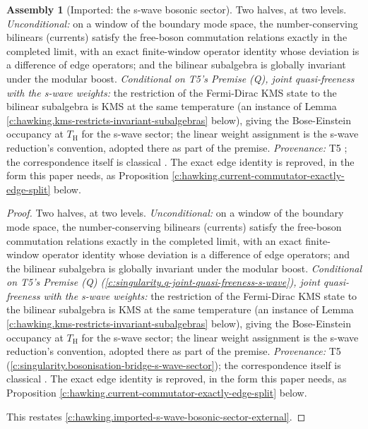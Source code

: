 \documentclass[11pt]{article}
\theoremstyle{definition}
\newtheorem{assembled}[theorem]{Assembly}
\theoremstyle{plain}
\newcommand{\changedmark}[2]{\marginpar{\raggedright\scriptsize\color{#1}#2}}
\providecommand{\TH}{}\renewcommand{\TH}{T_{\mathrm{H}}}
\begin{document}
\begin{assembled}[Imported: the s-wave bosonic sector]\label{c:hawking.imported-s-wave-bosonic-sector}
\changedmark{gray}{reworded}
Two halves, at two levels. \emph{Unconditional:} on a window of the boundary mode space, the number-conserving bilinears (currents) satisfy the free-boson commutation relations exactly in the completed limit, with an exact finite-window operator identity whose deviation is a difference of edge operators; and the bilinear subalgebra is globally invariant under the modular boost. \emph{Conditional on T5's Premise (Q), joint quasi-freeness with the s-wave weights:} the restriction of the Fermi-Dirac KMS state to the bilinear subalgebra is KMS at the same temperature (an instance of Lemma \ref{c:hawking.kms-restricts-invariant-subalgebras} below), giving the Bose-Einstein occupancy at $\TH$ for the s-wave sector; the linear weight assignment is the s-wave reduction's convention, adopted there as part of the premise. \emph{Provenance:} T5 \cite[Prem.~8.1, Thm.~8.2]{ButlerT5}; the correspondence itself is classical \cite{FrenkelKac1980}. The exact edge identity is reproved, in the form this paper needs, as Proposition \ref{c:hawking.current-commutator-exactly-edge-split} below.
\end{assembled}
\begin{proof}
Two halves, at two levels. \emph{Unconditional:} on a window of the boundary mode space, the number-conserving bilinears (currents) satisfy the free-boson commutation relations exactly in the completed limit, with an exact finite-window operator identity whose deviation is a difference of edge operators; and the bilinear subalgebra is globally invariant under the modular boost. \emph{Conditional on T5's Premise (Q) (\ref{c:singularity.q-joint-quasi-freeness-s-wave}), joint quasi-freeness with the s-wave weights:} the restriction of the Fermi-Dirac KMS state to the bilinear subalgebra is KMS at the same temperature (an instance of Lemma \ref{c:hawking.kms-restricts-invariant-subalgebras} below), giving the Bose-Einstein occupancy at $\TH$ for the s-wave sector; the linear weight assignment is the s-wave reduction's convention, adopted there as part of the premise. \emph{Provenance:} T5 \cite[Prem.~8.1, Thm.~8.2]{ButlerT5} (\ref{c:singularity.bosonisation-bridge-s-wave-sector}); the correspondence itself is classical \cite{FrenkelKac1980}. The exact edge identity is reproved, in the form this paper needs, as Proposition \ref{c:hawking.current-commutator-exactly-edge-split} below.

This restates \ref{c:hawking.imported-s-wave-bosonic-sector-external}.

\end{proof}
\end{document}
